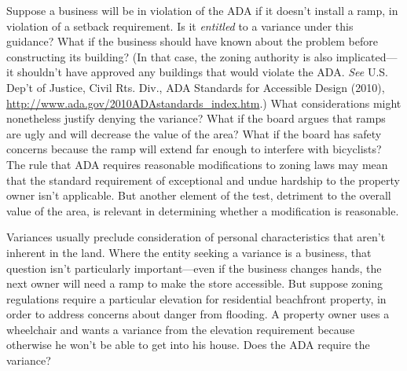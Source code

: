 \item Suppose a business will be in violation of the ADA if it doesn't install a
ramp, in violation of a setback requirement. Is it \textit{entitled} to a
variance under this guidance? What if the business should have known about the
problem before constructing its building? (In that case, the zoning authority is
also implicated---it shouldn't have approved any buildings that would violate
the ADA. \textit{See} U.S. Dep't of Justice, Civil Rts. Div., ADA
Standards for Accessible Design (2010),
\url{http://www.ada.gov/2010ADAstandards_index.htm}.) What considerations might
nonetheless justify denying the variance? What if the board argues that ramps
are ugly and will decrease the value of the area? What if the board has safety
concerns because the ramp will extend far enough to interfere with bicyclists?
The rule that ADA requires reasonable modifications to zoning laws may mean that
the standard requirement of exceptional and undue hardship to the property owner
isn't applicable. But another element of the test, detriment to the overall
value of the area, is relevant in determining whether a modification is
reasonable.

\item Variances usually preclude consideration of personal characteristics that
aren't inherent in the land. Where the entity seeking a variance is a business,
that question isn't particularly important---even if the business changes hands,
the next owner will need a ramp to make the store accessible. But suppose zoning
regulations require a particular elevation for residential beachfront property,
in order to address concerns about danger from flooding. A property owner uses a
wheelchair and wants a variance from the elevation requirement because otherwise
he won't be able to get into his house. Does the ADA require the variance?

